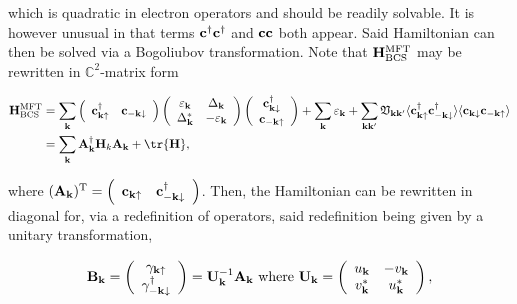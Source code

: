 which is quadratic in electron operators and should be readily solvable. It is however unusual in that terms ${\bf c}^\dagger {\bf c}^\dagger$ and ${\bf c} {\bf c}$ both appear. Said Hamiltonian can then be solved via a Bogoliubov transformation. Note that ${\bf H}_{\textnormal{BCS}}^{\textnormal{MFT}}$ may be rewritten in $\mathds{C}^2$-matrix form 

\begin{equation}
\begin{split}
    {\bf H}_{\textnormal{BCS}}^{\textnormal{MFT}} &= \sum_{{\bf k}} \left( \begin{array}{cc}
        {\bf c}_{{\bf k}\uparrow}^\dagger & {\bf c}_{-{\bf k}\downarrow} \\ 
    \end{array} \right) \left(\begin{array}{cc}
        \varepsilon_{\bf k} &  \Delta_{{\bf k}}\\
        \Delta_{{\bf k}}^* & -\varepsilon_{\bf k}
    \end{array} \right) \left( \begin{array}{c}
        {\bf c}_{{\bf k}\downarrow}^\dagger \\
        {\bf c}_{-{\bf k}\uparrow} 
    \end{array} \right) + \sum_{{\bf k}} \varepsilon_{{\bf k}} + \sum_{{\bf k} {\bf k'}} \mathfrak{V}_{{\bf k} {\bf k'}} \langle {\bf c}_{{\bf k} \uparrow}^\dagger {\bf c}_{-{\bf k} \downarrow}^\dagger \rangle \langle {\bf c}_{{\bf k} \downarrow} {\bf c}_{-{\bf k} \uparrow} \rangle \\
    &= \sum_{{\bf k}} {\bf A}_{{\bf k}}^\dagger {\bf H}_k {\bf A}_{{\bf k}} + \tr {\bf H},
\end{split}
\end{equation}

where $({\bf A}_{\bf k})^{\textnormal{T}} = \left( \begin{array}{cc}
     {\bf c}_{{\bf k}\uparrow} &
     {\bf c}_{-{\bf k}\downarrow}^\dagger  
\end{array} \right)$. Then, the Hamiltonian can be rewritten in diagonal for, via a redefinition of operators, said redefinition being given by a unitary transformation,

\begin{align}
    {\bf B}_{{\bf k}} = \left( \begin{array}{c}
     {\gamma}_{{\bf k}\uparrow}  \\
     {\gamma}_{-{\bf k}\downarrow}^\dagger  
\end{array} \right) = {\bf U}_{{\bf k}}^{-1} {\bf A}_{\bf k} \textnormal{ where } {\bf U}_{\bf k} = \left( \begin{array}{cc}
    u_{{\bf k}} & -v_{{\bf k}} \\
    v_{{\bf k}}^* & u_{{\bf k}}^*
\end{array} \right),
\end{align}

